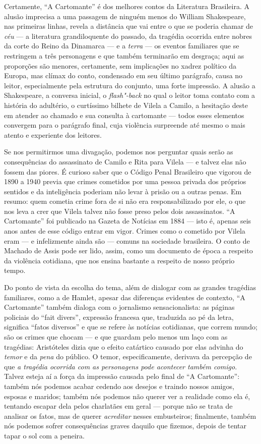 Certamente, ``A Cartomante'' é dos melhores contos da Literatura
Brasileira. A alusão imprecisa a uma passagem de ninguém menos do
William Shakespeare, nas primeiras linhas, revela a distância que vai
entre o que se poderia chamar de \emph{céu} --- a literatura
grandiloquente do passado, da tragédia ocorrida entre nobres da corte do
Reino da Dinamarca --- e a \emph{terra} --- os eventos familiares que se
restringem a três personagens e que também terminarão em desgraça; aqui
as proporções são menores, certamente, sem implicações no xadrez
político da Europa, mas clímax do conto, condensado em seu último
parágrafo, causa no leitor, especialmente pela estrutura do conjunto,
uma forte impressão. A alusão a Shakespeare, a conversa inicial, o
\emph{flash"-back} no qual o leitor toma contato com a história do
adultério, o curtíssimo bilhete de Vilela a Camilo, a hesitação deste em
atender ao chamado e sua consulta à cartomante --- todos esses elementos
convergem para o parágrafo final, cuja violência surpreende até mesmo o
mais atento e experiente dos leitores.

Se nos permitirmos uma divagação, podemos nos perguntar quais serão as
consequências do assassinato de Camilo e Rita para Vilela --- e talvez
elas não fossem das piores. É curioso saber que o Código Penal
Brasileiro que vigorou de 1890 a 1940 previa que crimes cometidos por
uma pessoa privada dos próprios sentidos e da inteligência poderiam não
levar à prisão ou a outras penas. Em resumo: quem cometia crime fora de
si não era responsabilizado por ele, o que nos leva a crer que Vilela
talvez não fosse preso pelos dois assassinatos. ``A Cartomante'' foi
publicado na Gazeta de Notícias em 1884 --- isto é, apenas seis anos
antes de esse código entrar em vigor. Crimes como o cometido por Vilela
eram --- e infelizmente ainda são --- comuns na sociedade brasileira. O
conto de Machado de Assis pode ser lido, assim, como um documento de
época a respeito da violência cotidiana, que nos ensina bastante a
respeito de nosso próprio tempo.

Do ponto de vista da escolha do tema, além de dialogar com as grandes
tragédias familiares, como a de Hamlet, apesar das diferenças evidentes
de contexto, ``A Cartomante'' também dialoga com o jornalismo
sensacionalista: as páginas policiais do ``fait divers'', expressão
francesa que, traduzida ao pé da letra, significa ``fatos diversos'' e
que se refere às notícias cotidianas, que correm mundo; são os crimes
que chocam --- e que guardam pelo menos um laço com as tragédias:
Aristóteles dizia que o efeito catártico causado por elas advinha do
\emph{temor} e da \emph{pena} do público. O temor, especificamente,
derivava da percepção de que \emph{a tragédia ocorrida com as
personagens pode acontecer também comigo}. Talvez esteja aí a força da
impressão causada pelo final de ``A Cartomante'': também nós podemos
acabar cedendo aos desejos e traindo nossos amigos, esposas e maridos;
também nós podemos não querer ver a realidade como ela é, tentando
escapar dela pelos charlatães em geral --- porque não se trata de
analisar os fatos, mas de querer \emph{acreditar} nesses embusteiros;
finalmente, também nós podemos sofrer consequências graves daquilo que
fizemos, depois de tentar tapar o sol com a peneira.

